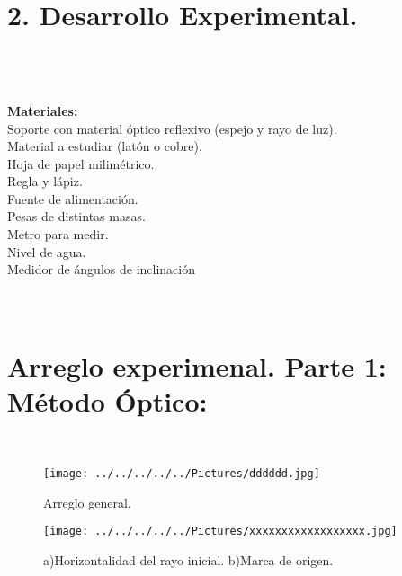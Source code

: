 \documentclass[10pt,a4paper]{article}
\begin{document}
\section*{2.  Desarrollo Experimental.}\\
\\
\\
\textbf{Materiales:} \\
Soporte con material \'{o}ptico reflexivo (espejo y rayo de luz).\\
Material a estudiar (lat\'{o}n o cobre). \\
Hoja de papel milim\'{e}trico. \\
Regla y l\'{a}piz. \\
Fuente de alimentaci\'{o}n.\\
Pesas de distintas masas. \\
Metro para medir. \\
Nivel de agua. \\
Medidor de \'{a}ngulos de inclinaci\'{o}n \\
\\
\\
\section*{Arreglo experimenal. Parte 1: M\'{e}todo \'{O}ptico:} \\

\begin{figure}[hbtp]
\centering
\texttt{[image: ../../../../../Pictures/dddddd.jpg]}
\caption{Arreglo general. }
\end{figure}

\begin{figure}[hbtp]
\centering
\texttt{[image: ../../../../../Pictures/xxxxxxxxxxxxxxxxxx.jpg]}
\caption{a)Horizontalidad del rayo inicial.  b)Marca de origen.  }
\end{figure}
\end{document}

